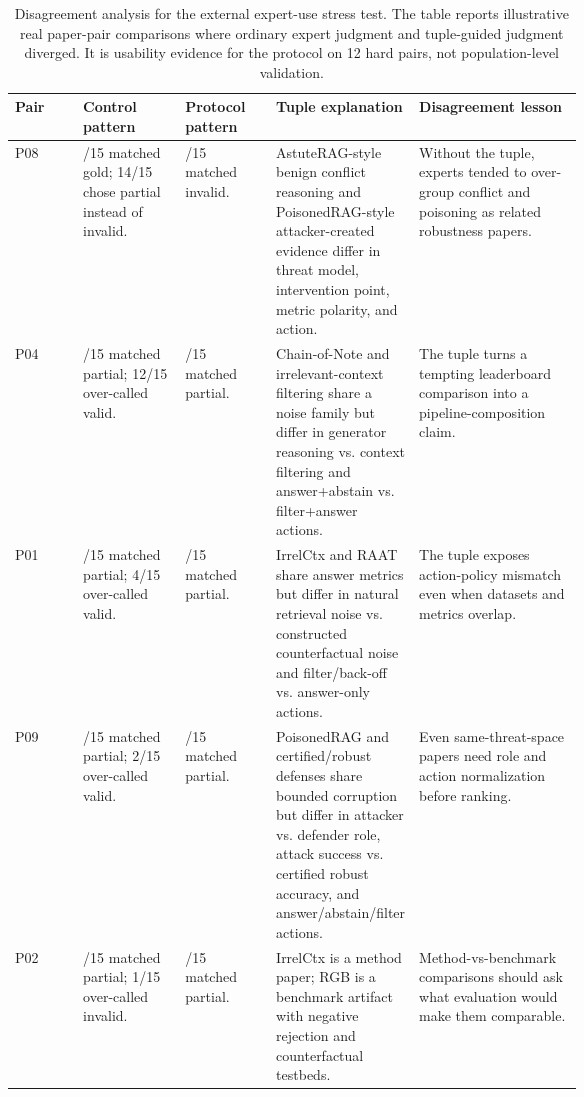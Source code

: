 \documentclass[11pt]{article}
\begin{document}
\begin{table}[t]
\centering
\scriptsize
\renewcommand{\arraystretch}{0.88}
\begin{tabularx}{\linewidth}{>{\raggedright\arraybackslash}p{0.12\linewidth}>{\raggedright\arraybackslash}p{0.18\linewidth}>{\raggedright\arraybackslash}p{0.16\linewidth}>{\raggedright\arraybackslash}p{0.20\linewidth}X}
\toprule
\textbf{Pair} & \textbf{Control pattern} & \textbf{Protocol pattern} & \textbf{Tuple explanation} & \textbf{Disagreement lesson} \\
\midrule
P08 & 1/15 matched gold; 14/15 chose partial instead of invalid. & 13/15 matched invalid. & AstuteRAG-style benign conflict reasoning and PoisonedRAG-style attacker-created evidence differ in threat model, intervention point, metric polarity, and action. & Without the tuple, experts tended to over-group conflict and poisoning as related robustness papers. \\
P04 & 3/15 matched partial; 12/15 over-called valid. & 15/15 matched partial. & Chain-of-Note and irrelevant-context filtering share a noise family but differ in generator reasoning vs. context filtering and answer+abstain vs. filter+answer actions. & The tuple turns a tempting leaderboard comparison into a pipeline-composition claim. \\
P01 & 11/15 matched partial; 4/15 over-called valid. & 15/15 matched partial. & IrrelCtx and RAAT share answer metrics but differ in natural retrieval noise vs. constructed counterfactual noise and filter/back-off vs. answer-only actions. & The tuple exposes action-policy mismatch even when datasets and metrics overlap. \\
P09 & 13/15 matched partial; 2/15 over-called valid. & 15/15 matched partial. & PoisonedRAG and certified/robust defenses share bounded corruption but differ in attacker vs. defender role, attack success vs. certified robust accuracy, and answer/abstain/filter actions. & Even same-threat-space papers need role and action normalization before ranking. \\
P02 & 14/15 matched partial; 1/15 over-called invalid. & 15/15 matched partial. & IrrelCtx is a method paper; RGB is a benchmark artifact with negative rejection and counterfactual testbeds. & Method-vs-benchmark comparisons should ask what evaluation would make them comparable. \\
\bottomrule
\end{tabularx}
\caption{Disagreement analysis for the external expert-use stress test. The table reports illustrative real paper-pair comparisons where ordinary expert judgment and tuple-guided judgment diverged. It is usability evidence for the protocol on 12 hard pairs, not population-level validation.}
\label{tab:expert-disagreement-analysis}
\end{table}
\end{document}

